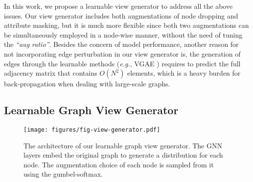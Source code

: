 In this work, we propose a learnable view generator to address all the above issues. Our view generator includes both augmentations of node dropping and attribute masking, but it is much more flexible since both two augmentations can be simultaneously employed in a node-wise manner, without the need of tuning the \emph{``aug ratio''}. Besides the concern of model performance, another reason for not incorporating edge perturbation in our view generator is, the generation of edges through the learnable methods (\textit{e.g.}, VGAE \cite{kipf2016vgae}) requires to predict the full adjacency matrix that contains $O(N^2)$ elements, which is a heavy burden for back-propagation when dealing with large-scale graphs.

\subsection{Learnable Graph View Generator}

\begin{figure}[t]
    \begin{center}
    \texttt{[image: figures/fig-view-generator.pdf]}
    \end{center}
    \vspace{-0.5cm}
    \caption{The architecture of our learnable graph view generator. The GNN layers embed the original graph to generate a distribution for each node. The augmentation choice of each node is sampled from it using the gumbel-softmax.
    }%
    \vspace{-0.5cm}
    \label{fig-view-generator}
\end{figure}

